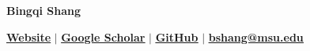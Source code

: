 \documentclass{resume}
\newcommand*{\git}{\vcenter{\hbox{\texttt{[image: icon/Git.png]}}}}
\newcommand*{\Google}{\vcenter{\hbox{\texttt{[image: icon/Google.png]}}}}
\newcommand*{\web}{\vcenter{\hbox{\texttt{[image: icon/Web.png]}}}}
\newcommand*{\phone}{\vcenter{\hbox{\texttt{[image: icon/Phone.png]}}}}
\begin{document}




\begin{center}
    \huge{\textbf{Bingqi Shang}}
    
    \vspace{0.2cm}
    \small
    \faGlobe\;\href{https://bio.bingqi-shang.com/}{\textcolor{BS_color}{\underline{\textbf{Website}}}} 
    \hspace{1mm}$|$\hspace{1mm}
    \faGraduationCap\;\href{https://scholar.google.com/citations?authuser=3&user=8xedwl0AAAAJ}{\textcolor{BS_color}{\bf\underline{Google Scholar}}} 
    \hspace{1mm}$|$\hspace{1mm}
    \faGithub\;\href{https://github.com/bshang17}{\textcolor{BS_color}{\bf\underline{GitHub}}}
    \hspace{1mm}$|$\hspace{1mm}
    \faEnvelope\;\href{mailto:bshang@msu.edu}{\textcolor{BS_color}{\underline{\textbf{bshang@msu.edu}}}}

\end{center}
    
\end{document}
